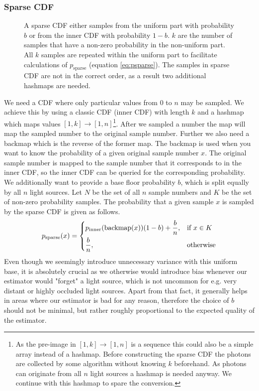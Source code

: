\subsubsection{Sparse CDF}
\label{sec:sparse}
\begin{figure}[htb] 
	\centering
    
    \caption{A sparse CDF either samples from the uniform part with probability $b$ or from the inner CDF with probability $1-b$. $k$ are the number of samples that have a non-zero probability in the non-uniform part. All $k$ samples are repeated within the uniform part to facilitate calculations of $p_{\text{sparse}}$ (equation \ref{eq:psparse}). The samples in sparse CDF are not in the correct order, as a result two additional hashmaps are needed.} 
    \label{fig:sparseCDF}
\end{figure}

We need  a CDF where only particular values from $0$ to $n$ may be sampled. We achieve this by using a classic CDF (inner CDF) with length $k$ and a hashmap which maps values $[1,k]\to [1,n]$\footnote{As the pre-image in $[1,k]\to [1,n]$ is a sequence this could also be a simple array instead of a hashmap. Before constructing the sparse CDF the photons are collected by some algorithm without knowing $k$ beforehand. As photons can originate from all $n$ light sources a hashmap is needed anyway. We continue with this hashmap to spare the conversion.}. After we sampled a number the map will map the sampled number to the original sample number. Further we also need a backmap which is the reverse of the former map. The backmap is used when you want to know the probability of a given original sample number $x$. The original sample number is mapped to the sample number that it corresponds to in the inner CDF, so the inner CDF can be queried for the corresponding probability. We additionally want to provide a base floor probability $b$, which is split equally by all $n$ light sources. Let $N$ be the set of all $n$ sample numbers and $K$ be the set of non-zero probability samples. The probability that a given sample $x$ is sampled by the sparse CDF is given as follows.
\begin{align}\label{eq:psparse}
 p_{\text{sparse}}(x) = 
\begin{dcases}
    p_{\text{inner}}(\text{backmap}(x))(1 - b) + \frac{b}{n},& \text{if } x \in K\\
    \frac{b}{n}, & \text{otherwise}
\end{dcases}
\end{align}
Even though we seemingly introduce unnecessary variance with this uniform base, it is absolutely crucial as we otherwise would introduce bias whenever our estimator would "forget" a light source, which is not uncommon for e.g. very distant or highly occluded light sources. Apart from that fact, it generally helps in areas where our estimator is bad for any reason, therefore the choice of $b$ should not be minimal, but rather roughly proportional to the expected quality of the estimator.

